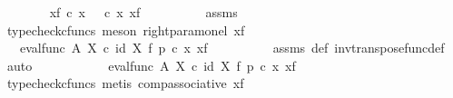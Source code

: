 \begin{isabellebody}
\ \ \ \ \ \ \isamarkupfalse%
\ {\isachardoublequoteopen}{\isasymphi}\isactrlbsub {\isacharbrackleft}{\kern0pt}{\isacharminus}{\kern0pt}{\isacharcomma}{\kern0pt}x{\isacharunderscore}{\kern0pt}f{\isacharbrackright}{\kern0pt}\isactrlesub \ {\isasymcirc}\isactrlsub c\ x\ {\isacharequal}{\kern0pt}\ {\isasymphi}\ {\isasymcirc}\isactrlsub c\ {\isasymlangle}x{\isacharcomma}{\kern0pt}\ x{\isacharunderscore}{\kern0pt}f{\isasymrangle}{\isachardoublequoteclose}\isanewline
\ \ \ \ \ \ \ \ \isamarkupfalse%
\ assms\ \isamarkupfalse%
\ {\isacharparenleft}{\kern0pt}typecheck{\isacharunderscore}{\kern0pt}cfuncs{\isacharcomma}{\kern0pt}\ meson\ right{\isacharunderscore}{\kern0pt}param{\isacharunderscore}{\kern0pt}on{\isacharunderscore}{\kern0pt}el\ x{\isacharunderscore}{\kern0pt}f{\isacharparenright}{\kern0pt}\isanewline
\ \ \ \ \ \ \isamarkupfalse%
\ \isamarkupfalse%
\ {\isachardoublequoteopen}{\isachardot}{\kern0pt}{\isachardot}{\kern0pt}{\isachardot}{\kern0pt}\ {\isacharequal}{\kern0pt}\ {\isacharparenleft}{\kern0pt}{\isacharparenleft}{\kern0pt}eval{\isacharunderscore}{\kern0pt}func\ A\ X{\isacharparenright}{\kern0pt}\ {\isasymcirc}\isactrlsub c\ {\isacharparenleft}{\kern0pt}id\ X\ {\isasymtimes}\isactrlsub f\ p{\isacharparenright}{\kern0pt}{\isacharparenright}{\kern0pt}\ {\isasymcirc}\isactrlsub c\ {\isasymlangle}x{\isacharcomma}{\kern0pt}\ x{\isacharunderscore}{\kern0pt}f{\isasymrangle}{\isachardoublequoteclose}\isanewline
\ \ \ \ \ \ \ \ \isamarkupfalse%
\ assms\ {\isasymphi}{\isacharunderscore}{\kern0pt}def\ inv{\isacharunderscore}{\kern0pt}transpose{\isacharunderscore}{\kern0pt}func{\isacharunderscore}{\kern0pt}def{}\ \isamarkupfalse%
\ auto\isanewline
\ \ \ \ \ \ \isamarkupfalse%
\ \isamarkupfalse%
\ {\isachardoublequoteopen}{\isachardot}{\kern0pt}{\isachardot}{\kern0pt}{\isachardot}{\kern0pt}\ {\isacharequal}{\kern0pt}\ {\isacharparenleft}{\kern0pt}eval{\isacharunderscore}{\kern0pt}func\ A\ X{\isacharparenright}{\kern0pt}\ {\isasymcirc}\isactrlsub c\ {\isacharparenleft}{\kern0pt}id\ X\ {\isasymtimes}\isactrlsub f\ p{\isacharparenright}{\kern0pt}\ {\isasymcirc}\isactrlsub c\ {\isasymlangle}x{\isacharcomma}{\kern0pt}\ x{\isacharunderscore}{\kern0pt}f{\isasymrangle}{\isachardoublequoteclose}\isanewline
\ \ \ \ \ \ \ \ \isamarkupfalse%
\ {\isacharparenleft}{\kern0pt}typecheck{\isacharunderscore}{\kern0pt}cfuncs{\isacharcomma}{\kern0pt}\ metis\ comp{\isacharunderscore}{\kern0pt}associative{}\ x{\isacharunderscore}{\kern0pt}f{\isacharparenright}{\kern0pt}\isanewline

\end{isabellebody}
